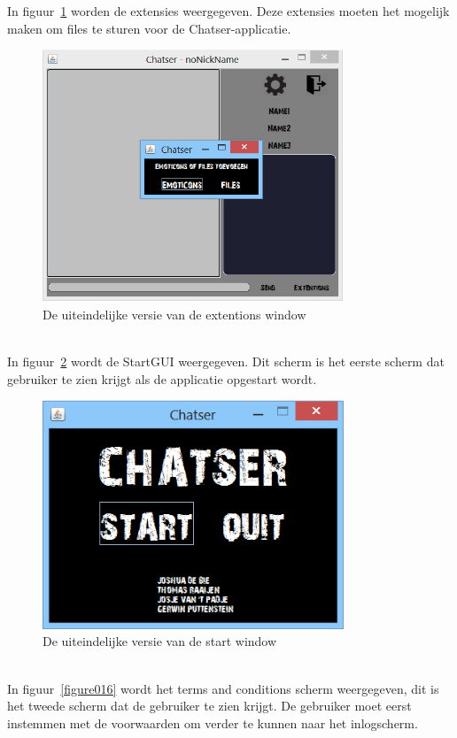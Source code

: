 \documentclass[12pt]{article}
\begin{document}
\noindent In figuur~\ref{figure014} worden de extensies weergegeven. Deze extensies moeten het mogelijk maken om files te sturen voor de Chatser-applicatie\small\textcopyright.
\begin{figure}[!h]
\begin{center}
\includegraphics[width = 90mm]{chatser_extentions}
\caption{De uiteindelijke versie van de extentions window}
\label{figure014}
\end{center}
\end{figure}
\\

\noindent In figuur~\ref{figure015} wordt de StartGUI weergegeven. Dit scherm is het eerste scherm dat gebruiker te zien krijgt als de applicatie opgestart wordt.
\begin{figure}[!h]
\begin{center}
\includegraphics[width = 90mm]{StartGUI}
\caption{De uiteindelijke versie van de start window}
\label{figure015}
\end{center}
\end{figure}
\\

\noindent In figuur~\ref{figure016} wordt het terms and conditions scherm weergegeven, dit is het tweede scherm dat de gebruiker te zien krijgt. De gebruiker moet eerst instemmen met de voorwaarden om verder te kunnen naar het inlogscherm. \newpage
\end{document}
